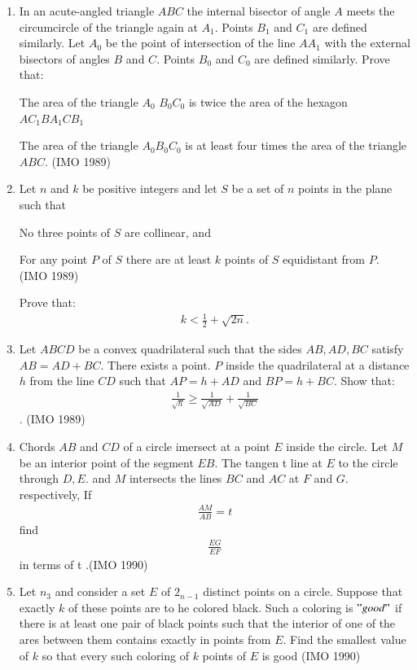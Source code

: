 \begin{enumerate}
\item In an acute-angled triangle $ABC$ the internal bisector of angle $A$ meets the circumcircle of the triangle again at $A_1$. Points $B_1$ and $C_1$ are defined similarly. Let $A_0$ be the point of intersection of the line $AA_1$ with the external bisectors of angles $B$ and $C$. Points $B_0$ and $C_0$ are defined similarly. Prove that: 

 The area of the triangle $A_0$ $B_0C_0$ is twice the area of the hexagon $AC_1BA_1CB_1$

 The area of the triangle $A_0B_0C_0$ is at least four times the area of the triangle $ABC$. \hfill(IMO 1989)

\item Let $n$ and $k$ be positive integers and let $S$ be a set of $n$ points in the plane such that

 No three points of $S$ are collinear, and 

 For any point $P$ of $S$ there are at least $k$ points of $S$ equidistant from $P$. \hfill(IMO 1989)

		Prove that: \begin{align*}k < \frac{1}{2} + \sqrt{2n}.\end{align*}

	\item Let $ABCD$ be a convex quadrilateral such that the sides ${AB, AD, BC}$ satisfy $AB= AD + BC$. There exists a point. $P$ inside the quadrilateral at a distance $h$ from the line $CD$ such that $AP= h+ AD$ and $BP= h + BC$. Show that:\begin{align*}
	\frac{1}{\sqrt{h}}\geq\frac{1}{\sqrt{AD}}+\frac{1}{\sqrt{BC}}\end{align*}. \hfill(IMO 1989)


   \item Chords $AB$ and $CD$ of a circle imersect at a point $E$ inside the circle. Let $M$ be an interior point of the segment $EB$. The tangen    t line at $E$ to the circle through $D, E$. and $M$ intersects the lines $BC$ and $AC$ at $F$ and $G$. respectively,                                      If \begin{align*}\frac{AM}{AB}=t \end{align*}      
  find \begin{align*} \frac{EG}{EF}\end{align*}  
	  in terms of t .\hfill(IMO 1990)


      \item Let $n_3$ and consider a set $E$ of $2_{n-1}$ distinct points on a circle. Suppose that exactly $k$ of these points are to he colored black. Such a coloring is $"good"$ if there is at least  one pair of black points such that the interior of one of the ares between them contains exactly in points from $E$. Find the smallest value of $k$ so that every such coloring of $k$ points of $E$ is good \hfill(IMO 1990)



\end{enumerate}
